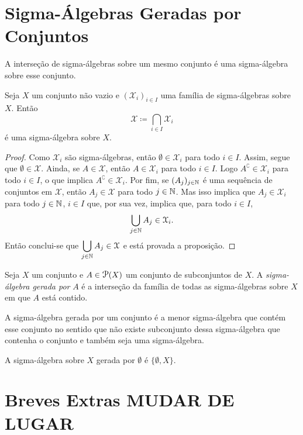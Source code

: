 \section{Sigma-Álgebras Geradas por Conjuntos}

\begin{prop}
	A interseção de sigma-álgebras sobre um mesmo conjunto é uma sigma-álgebra sobre esse conjunto.

	Seja $X$ um conjunto não vazio e $(\mathcal X_i)_{i \in I}$ uma família de sigma-álgebras sobre $X$. Então
	\begin{equation*}
	\mathcal X \coloneqq \bigcap_{i \in I} \mathcal X_i
	\end{equation*}
é uma sigma-álgebra sobre $X$.
\end{prop}
\begin{proof}
	Como $\mathcal X_i$ são sigma-álgebras, então $\emptyset \in \mathcal X_i$ para todo $i \in I$. Assim, segue que $\emptyset \in \mathcal X$. Ainda, se $A \in \mathcal X$, então $A \in \mathcal X_i$ para todo $i \in I$. Logo $A^\complement \in \mathcal X_i$ para todo $i \in I$, o que implica $A^\complement \in \mathcal X_i$. Por fim, se $(A_j)_{j \in \mathbb{N}}$ é uma sequência de conjuntos em $\mathcal X$, então $A_j \in \mathcal X$ para todo $j \in \mathbb{N}$. Mas isso implica que $A_j \in \mathcal X_i$ para todo $j \in \mathbb{N}$, $i \in I$ que, por sua vez, implica que, para todo $i \in I$,
	\begin{equation*}
	\bigcup_{j \in \mathbb{N}} A_j \in \mathcal X_i.
	\end{equation*}
Então conclui-se que $\displaystyle\bigcup_{j \in \mathbb{N}} A_j \in \mathcal X$ e está provada a proposição.
\end{proof}

\begin{defi}
	Seja $X$ um conjunto e $A \in \p(X)$ um conjunto de subconjuntos de $X$. A \emph{sigma-álgebra gerada por} $A$ é a interseção da família de todas as sigma-álgebras sobre $X$ em que $A$ está contido.
\end{defi}
	
	A sigma-álgebra gerada por um conjunto é a menor sigma-álgebra que contém esse conjunto no sentido que não existe subconjunto dessa sigma-álgebra que contenha o conjunto e também seja uma sigma-álgebra.

\begin{ex}
	A sigma-álgebra sobre $X$ gerada por $\emptyset$ é $\{\emptyset, X\}$.
\end{ex}

\section{Breves Extras MUDAR DE LUGAR}

